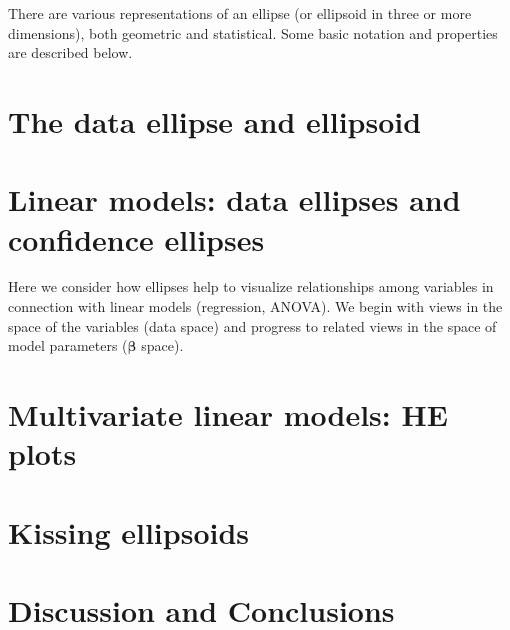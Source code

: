 \documentclass[11pt]{article}%
\renewcommand*{\vec}[1]{\ensuremath{\bm{#1}}}     %
\begin{document}
There are various representations of an ellipse (or ellipsoid in three or more dimensions),
both geometric and statistical. Some basic notation and properties are described below.



%
%

\section{The data ellipse and ellipsoid}\label{sec:data-ellipse}



\section{Linear models: data ellipses and confidence ellipses}\label{sec:lm}

Here we consider how ellipses help to visualize relationships among variables
in connection with linear models (regression, ANOVA).
We begin with views in the space of the variables (data space)
and progress to related views in the space of model parameters
($\vec{\beta}$ space).









\section{Multivariate linear models: HE plots}\label{sec:mlm}


\section{Kissing ellipsoids}\label{sec:kiss}









\section{Discussion and Conclusions}\label{sec:discussion}

\end{document}
